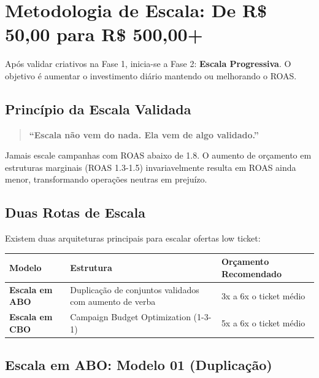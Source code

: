\documentclass[12pt, a4paper]{article}
\newcommand{\reais}[1]{R\$ #1}
\begin{document}
\needspace{8cm}

\section{Metodologia de Escala: De \reais{50,00} para \reais{500,00}+}

Após validar criativos na Fase 1, inicia-se a Fase 2: \textbf{Escala Progressiva}. O objetivo é aumentar o investimento diário mantendo ou melhorando o ROAS.

\subsection{Princípio da Escala Validada}

\begin{quote}
\textcolor{primaryColor}{\textbf{``Escala não vem do nada. Ela vem de algo validado.''}}
\end{quote}

Jamais escale campanhas com ROAS abaixo de 1.8. O aumento de orçamento em estruturas marginais (ROAS 1.3-1.5) invariavelmente resulta em ROAS ainda menor, transformando operações neutras em prejuízo.

\subsection{Duas Rotas de Escala}

Existem duas arquiteturas principais para escalar ofertas low ticket:

\begin{table}[H]
    \centering
    \small
    \renewcommand{\arraystretch}{1.4}
    \begin{tabularx}{\textwidth}{X X X}
        \toprule
        \rowcolor{tableHeader} \textbf{Modelo} & \textbf{Estrutura} & \textbf{Orçamento Recomendado} \\
        \midrule
        \textbf{Escala em ABO} & Duplicação de conjuntos validados com aumento de verba & 3x a 6x o ticket médio \\
        \rowcolor{lightGray}
        \textbf{Escala em CBO} & Campaign Budget Optimization (1-3-1) & 5x a 6x o ticket médio \\
        \bottomrule
    \end{tabularx}
\end{table}

\subsection{Escala em ABO: Modelo 01 (Duplicação)}
\end{document}
